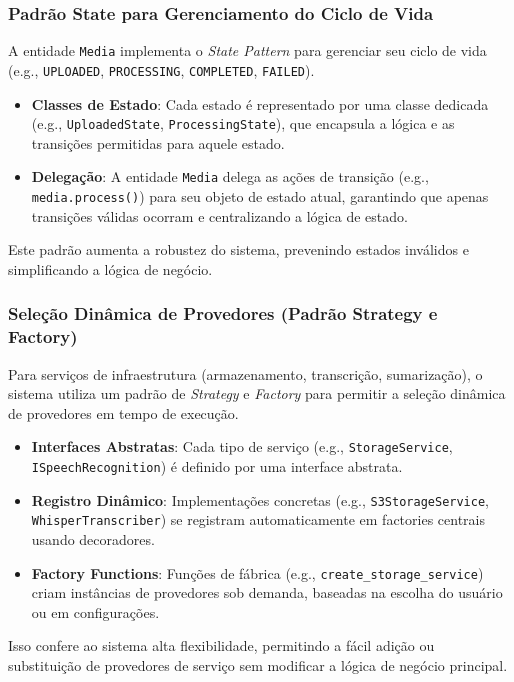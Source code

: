 \subsubsection{Padrão State para Gerenciamento do Ciclo de Vida}
A entidade \texttt{Media} implementa o \textit{State Pattern} para gerenciar seu ciclo de vida (e.g., \texttt{UPLOADED}, \texttt{PROCESSING}, \texttt{COMPLETED}, \texttt{FAILED}).
\begin{itemize}
    \item \textbf{Classes de Estado}: Cada estado é representado por uma classe dedicada (e.g., \texttt{UploadedState}, \texttt{ProcessingState}), que encapsula a lógica e as transições permitidas para aquele estado.
    \item \textbf{Delegação}: A entidade \texttt{Media} delega as ações de transição (e.g., \texttt{media.process()}) para seu objeto de estado atual, garantindo que apenas transições válidas ocorram e centralizando a lógica de estado.
\end{itemize}
Este padrão aumenta a robustez do sistema, prevenindo estados inválidos e simplificando a lógica de negócio.

\subsubsection{Seleção Dinâmica de Provedores (Padrão Strategy e Factory)}
Para serviços de infraestrutura (armazenamento, transcrição, sumarização), o sistema utiliza um padrão de \textit{Strategy} e \textit{Factory} para permitir a seleção dinâmica de provedores em tempo de execução.
\begin{itemize}
    \item \textbf{Interfaces Abstratas}: Cada tipo de serviço (e.g., \texttt{StorageService}, \texttt{ISpeechRecognition}) é definido por uma interface abstrata.
    \item \textbf{Registro Dinâmico}: Implementações concretas (e.g., \texttt{S3StorageService}, \texttt{WhisperTranscriber}) se registram automaticamente em factories centrais usando decoradores.
    \item \textbf{Factory Functions}: Funções de fábrica (e.g., \texttt{create\_storage\_service}) criam instâncias de provedores sob demanda, baseadas na escolha do usuário ou em configurações.
\end{itemize}
Isso confere ao sistema alta flexibilidade, permitindo a fácil adição ou substituição de provedores de serviço sem modificar a lógica de negócio principal.

